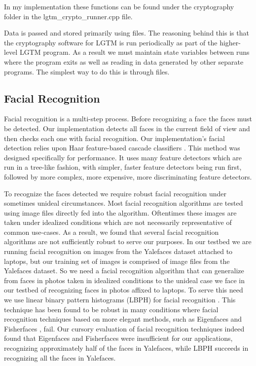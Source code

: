 \documentclass[12pt]{report}
\begin{document}
In my implementation these functions can be found under the cryptography folder in the lgtm\_crypto\_runner.cpp file. \par

Data is passed and stored primarily using files. The reasoning behind this is that the cryptography software for LGTM is run periodically as part of the higher-level LGTM program. As a result we must maintain state variables between runs where the program exits as well as reading in data generated by other separate programs. The simplest way to do this is through files. \par

\subsection{Facial Recognition}
Facial recognition is a multi-step process. Before recognizing a face the faces must be detected. Our implementation detects all faces in the current field of view and then checks each one with facial recognition. Our implementation's facial detection relies upon Haar feature-based cascade classifiers \cite{HaarCascadeViola2001}. This method was designed specifically for performance. It uses many feature detectors which are run in a tree-like fashion, with simpler, faster feature detectors being run first, followed by more complex, more expensive, more discriminating feature detectors. \par

To recognize the faces detected we require robust facial recognition under sometimes unideal circumstances. Most facial recognition algorithms are tested using image files directly fed into the algorithm. Oftentimes these images are taken under idealized conditions which are not necessarily representative of common use-cases. As a result, we found that several facial recognition algorithms are not sufficiently robust to serve our purposes. In our testbed we are running facial recognition on images from the Yalefaces dataset attached to laptops, but our training set of images is comprised of image files from the Yalefaces \cite{FisherfacesBelhumeur1997} dataset. So we need a facial recognition algorithm that can generalize from faces in photos taken in idealized conditions to the unideal case we face in our testbed of recognizing faces in photos affixed to laptops. To serve this need we use linear binary pattern histograms (LBPH) for facial recognition \cite{LBPHAhonen2004,LearningMultiScalBlockLBPHLiao2007}. This technique has been found to be robust in many conditions where facial recognition techniques based on more elegant methods, such as Eigenfaces \cite{EigenfacesTurk1991} and Fisherfaces \cite{FisherfacesBelhumeur1997}, fail. Our cursory evaluation of facial recognition techniques indeed found that Eigenfaces and Fisherfaces were insufficient for our applications, recognizing approximately half of the faces in Yalefaces, while LBPH succeeds in recognizing all the faces in Yalefaces. \par
\end{document}
